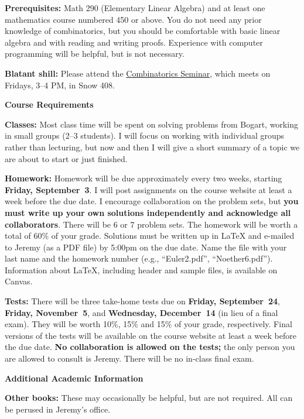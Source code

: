 \documentclass{amsart}
\newcommand{\Blue}{\color{blue}}
\newcommand{\yell}[1]{\textbf{\LARGE #1}}
\begin{document}
\textbf{Prerequisites:}
Math 290 (Elementary Linear Algebra) and at least one mathematics course numbered 450 or above.  You do not need any prior knowledge of combinatorics, but you should be comfortable with basic linear algebra and with reading and writing proofs.  Experience with computer programming will be helpful, but is not necessary.

\textbf{Blatant shill:}
  Please attend the \href{http://jlmartin.ku.edu/seminar.html}{\Blue Combinatorics Seminar}, which meets on Fridays, 3--4 PM, in Snow 408.

\vfill\yell{Course Requirements}

\textbf{Classes:}
  Most class time will be spent on solving problems from Bogart, working in small groups (2--3 students).  I will focus on working with individual groups rather than lecturing, but now and then I will give a short summary of a topic we are about to start or just finished.

\textbf{Homework:}
Homework will be due approximately every two weeks, starting \textbf{Friday, September~3}.  I will post assignments on the course website at least a week before the due date.  I encourage collaboration on the problem sets, but \textbf{you must write up your own solutions independently and acknowledge all collaborators}.  There will be 6 or 7 problem sets.  The homework will be worth a total of 60\% of your grade.  Solutions must be written up in LaTeX and e-mailed to Jeremy (as a PDF file) by 5:00pm on the due date.  Name the file with your last name and the homework number (e.g., ``Euler2.pdf'', ``Noether6.pdf'').  Information about LaTeX, including header and sample files, is available on Canvas.

\textbf{Tests:} 
  There will be three take-home tests due on \textbf{Friday, September~24}, \textbf{Friday, November~5}, and \textbf{Wednesday, December~14} (in lieu of a final exam).  They will be worth 10\%, 15\% and 15\% of your grade, respectively.  Final versions of the tests will be available on the course website at least a week before the due date.  \textbf{No collaboration is allowed on the tests;} the only person you are allowed to consult is Jeremy.  There will be no in-class final exam.

\vfill\pagebreak

\yell{Additional Academic Information}

\textbf{Other books:}  These may occasionally be helpful, but are not required.  All can be perused in Jeremy's office.
\end{document}
